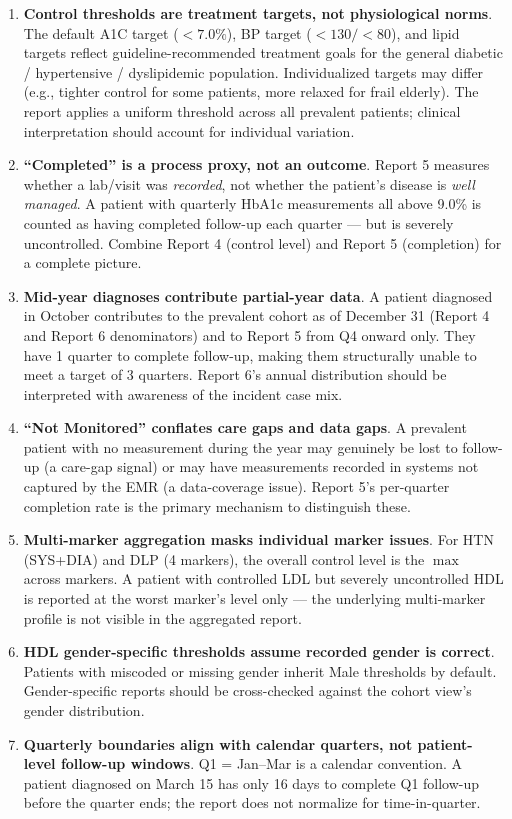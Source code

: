 \documentclass[11pt,a4paper]{article}
\begin{document}
\begin{enumerate}[leftmargin=*, label=\textbf{M2-L\arabic*}]
    \item \textbf{Control thresholds are treatment targets, not physiological norms}. The default A1C target ($< 7.0\%$), BP target ($< 130 / < 80$), and lipid targets reflect guideline-recommended treatment goals for the general diabetic / hypertensive / dyslipidemic population. Individualized targets may differ (e.g., tighter control for some patients, more relaxed for frail elderly). The report applies a uniform threshold across all prevalent patients; clinical interpretation should account for individual variation.
    \item \textbf{``Completed'' is a process proxy, not an outcome}. Report 5 measures whether a lab/visit was \textit{recorded}, not whether the patient's disease is \textit{well managed}. A patient with quarterly HbA1c measurements all above 9.0\% is counted as having completed follow-up each quarter --- but is severely uncontrolled. Combine Report 4 (control level) and Report 5 (completion) for a complete picture.
    \item \textbf{Mid-year diagnoses contribute partial-year data}. A patient diagnosed in October contributes to the prevalent cohort as of December 31 (Report 4 and Report 6 denominators) and to Report 5 from Q4 onward only. They have 1 quarter to complete follow-up, making them structurally unable to meet a target of 3 quarters. Report 6's annual distribution should be interpreted with awareness of the incident case mix.
    \item \textbf{``Not Monitored'' conflates care gaps and data gaps}. A prevalent patient with no measurement during the year may genuinely be lost to follow-up (a care-gap signal) or may have measurements recorded in systems not captured by the EMR (a data-coverage issue). Report 5's per-quarter completion rate is the primary mechanism to distinguish these.
    \item \textbf{Multi-marker aggregation masks individual marker issues}. For HTN (SYS+DIA) and DLP (4 markers), the overall control level is the $\max$ across markers. A patient with controlled LDL but severely uncontrolled HDL is reported at the worst marker's level only --- the underlying multi-marker profile is not visible in the aggregated report.
    \item \textbf{HDL gender-specific thresholds assume recorded gender is correct}. Patients with miscoded or missing gender inherit Male thresholds by default. Gender-specific reports should be cross-checked against the cohort view's gender distribution.
    \item \textbf{Quarterly boundaries align with calendar quarters, not patient-level follow-up windows}. Q1 = Jan--Mar is a calendar convention. A patient diagnosed on March 15 has only 16 days to complete Q1 follow-up before the quarter ends; the report does not normalize for time-in-quarter.
\end{enumerate}
\end{document}
